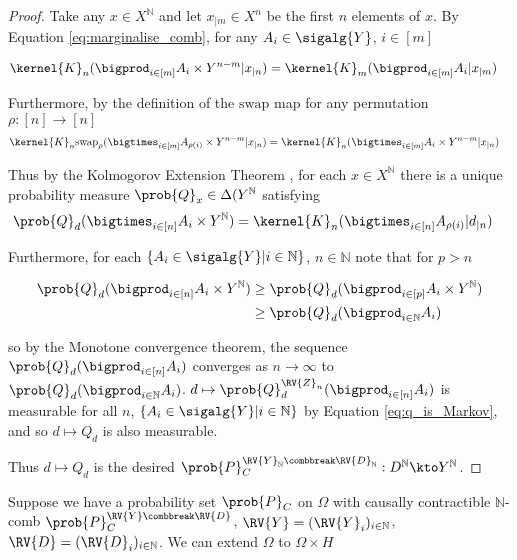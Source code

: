 \begin{proof}
Take any $x\in X^{\mathbb{N}}$ and let $x_{|m}\in X^n$ be the first $n$ elements of $x$. By Equation \ref{eq:marginalise_comb}, for any $A_i\in \sigalg{Y}$, $i\in [m]$

\begin{align}
    \kernel{K}_n(\bigprod_{i\in [m]}A_i\times Y^{n-m}|x_{|n}) &= \kernel{K}_m(\bigprod_{i\in [m]}A_i|x_{|m})
\end{align}

Furthermore, by the definition of the $\mathrm{swap}$ map for any permutation $\rho:[n]\to[n]$
\begin{align}
    \kernel{K}_n\mathrm{swap}_{\rho}(\bigtimes_{i\in [m]}A_{\rho(i)}\times Y^{n-m}|x_{|n}) &= \kernel{K}_n(\bigtimes_{i\in [m]}A_{i}\times Y^{n-m}|x_{|n})
\end{align}

Thus by the Kolmogorov Extension Theorem \citep{cinlar_probability_2011}, for each $x\in X^{\mathbb{N}}$ there is a unique probability measure $\prob{Q}_x\in \Delta(Y^{\mathbb{N}}$ satisfying
\begin{align}
    \prob{Q}_d(\bigtimes_{i\in [n]}A_i\times Y^{\mathbb{N}}) &= \kernel{K}_n(\bigtimes_{i\in [n]}A_{\rho(i)}|d_{|n})\label{eq:q_is_Markov}
\end{align}

Furthermore, for each $\{A_i\in\sigalg{Y}|i\in \mathbb{N}\}$, $n\in \mathbb{N}$ note that for $p>n$

\begin{align}
\prob{Q}_d(\bigprod_{i\in[n]} A_i \times Y^{\mathbb{N}})&\geq \prob{Q}_d(\bigprod_{i\in [p]} A_i\times Y^{\mathbb{N}})\\
&\geq \prob{Q}_d(\bigprod_{i\in \mathbb{N}} A_i)
\end{align}

so by the Monotone convergence theorem, the sequence $\prob{Q}_d(\bigprod_{i\in[n]} A_i)$ converges as $n\to \infty$ to $\prob{Q}_d(\bigprod_{i\in\mathbb{N}} A_i)$. $d\mapsto \prob{Q}_d^{\RV{Z}_n}(\bigprod_{i\in[n]} A_i)$ is measurable for all $n$, $\{A_i\in\sigalg{Y}|i\in \mathbb{N}\}$ by Equation \ref{eq:q_is_Markov}, and so $d\mapsto Q_d$ is also measurable.

Thus $d\mapsto Q_d$ is the desired $\prob{P}_C^{\RV{Y}_{\mathbb{N}}\combbreak \RV{D}_{\mathbb{N}}}:D^\mathbb{N}\kto Y^\mathbb{N}$.
\end{proof}


\begin{theorem}
Suppose we have a probability set $\prob{P}_C$ on $\Omega$ with causally contractible $\mathbb{N}$-comb $\prob{P}_C^{\RV{Y}\combbreak \RV{D}}$, $\RV{Y}=(\RV{Y}_i)_{i\in\mathbb{N}}$, $\RV{D}=(\RV{D}_i)_{i\in\mathbb{N}}$. We can extend $\Omega$ to $\Omega\times H$
\end{theorem}


